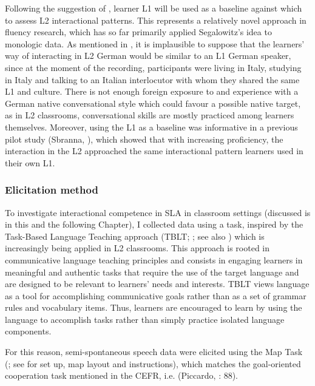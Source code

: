 Following the suggestion of \citet{Segalowitz2016}, learner L1 will be used as a baseline against which to assess L2 interactional patterns. This represents a relatively novel approach in fluency research, which has so far primarily applied Segalowitz’s idea to monologic data. As mentioned in , it is implausible to suppose that the learners’ way of interacting in L2 German would be similar to an L1 German speaker, since at the moment of the recording, participants were living in Italy, studying in Italy and talking to an Italian interlocutor with whom they shared the same L1 and culture. There is not enough foreign exposure to and experience with a German native conversational style which could favour a possible native target, as in L2 classrooms, conversational skills are mostly practiced among learners themselves. Moreover, using the L1 as a baseline was informative in a previous pilot study (Sbranna, \citealt{CangemiGrice2019}), which showed that with increasing proficiency, the interaction in the L2 approached the same interactional pattern learners used in their own L1. 

\subsubsection{Elicitation method}
\hypertarget{Toc191305931}{}
To investigate interactional competence in SLA in classroom settings (discussed is in this and the following Chapter), I collected data using a task, inspired by the Task-Based Language Teaching approach (TBLT; \citealt{Long1985,Long2015}; see also \citealt{GassMackey2014}) which is increasingly being applied in L2 classrooms. This approach is rooted in communicative language teaching principles and consists in engaging learners in meaningful and authentic tasks that require the use of the target language and are designed to be relevant to learners' needs and interests. TBLT views language as a tool for accomplishing communicative goals rather than as a set of grammar rules and vocabulary items. Thus, learners are encouraged to learn by using the language to accomplish tasks rather than simply practice isolated language components.

For this reason, semi-spontaneous speech data were elicited using the Map Task (\citealt{AndersonEtAl1991}; see \citealt{GriceSavino2003} for set up, map layout and instructions), which matches the goal-oriented cooperation task mentioned in the CEFR, i.e. (Piccardo, \citealt{GoodierNorth2018}: 88). 

